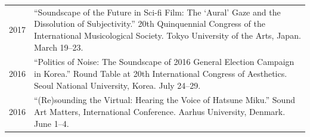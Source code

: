 \documentclass[a4paper,11pt,draft]{article}
\begin{document}
\begin{tabular}{p{2.5cm} p{12.5cm}}
  
    2017 & ``Soundscape of the Future in Sci-fi Film: The `Aural' Gaze and the Dissolution of Subjectivity.'' 20th Quinquennial Congress of the International Musicological Society. Tokyo University of the Arts, Japan. March 19--23.\\[2mm]
  

    2016 & ``Politics of Noise: The Soundscape of 2016 General Election Campaign in Korea.'' Round Table at 20th International Congress of Aesthetics. Seoul National University, Korea. July 24--29.\\[2mm]
  
    2016 & ``(Re)sounding the Virtual: Hearing the Voice of Hatsune Miku.'' Sound Art Matters, International Conference. Aarhus University, Denmark. June 1--4.\\[2mm]
  
  
    
    

\end{tabular}
\end{document}
